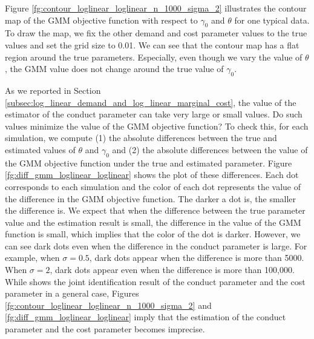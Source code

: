 \documentclass[11pt, a4paper]{article}
\begin{document}
Figure \ref{fg:contour_loglinear_loglinear_n_1000_sigma_2} illustrates the contour map of the GMM objective function with respect to $\gamma_0$ and $\theta$ for one typical data.
To draw the map, we fix the other demand and cost parameter values to the true values and set the grid size to 0.01.
We can see that the contour map has a flat region around the true parameters.
Especially, even though we vary the value of $\theta$, the GMM value does not change around the true value of $\gamma_0$.

As we reported in Section \ref{subsec:log_linear_demand_and_log_linear_marginal_cost}, the value of the estimator of the conduct parameter can take very large or small values.
Do such values minimize the value of the GMM objective function?
To check this, for each simulation, we compute (1) the absolute differences between the true and estimated values of $\theta$ and $\gamma_0$ and (2) the absolute differences between the value of the GMM objective function under the true and estimated parameter.
Figure \ref{fg:diff_gmm_loglinear_loglinear} shows the plot of these differences. 
Each dot corresponds to each simulation and the color of each dot represents the value of the difference in the GMM objective function. 
The darker a dot is, the smaller the difference is.
We expect that when the difference between the true parameter value and the estimation result is small, the difference in the value of the GMM function is small, which implies that the color of the dot is darker. 
However, we can see dark dots even when the difference in the conduct parameter is large.
For example, when $\sigma = 0.5$, dark dots appear when the difference is more than 5000.
When $\sigma = 2$, dark dots appear even when the difference is more than 100,000.
While \citet{lau1982identifying} shows the joint identification result of the conduct parameter and the cost parameter in a general case, Figures \ref{fg:contour_loglinear_loglinear_n_1000_sigma_2} and \ref{fg:diff_gmm_loglinear_loglinear} imply that the estimation of the conduct parameter and the cost parameter becomes imprecise.
\end{document}
